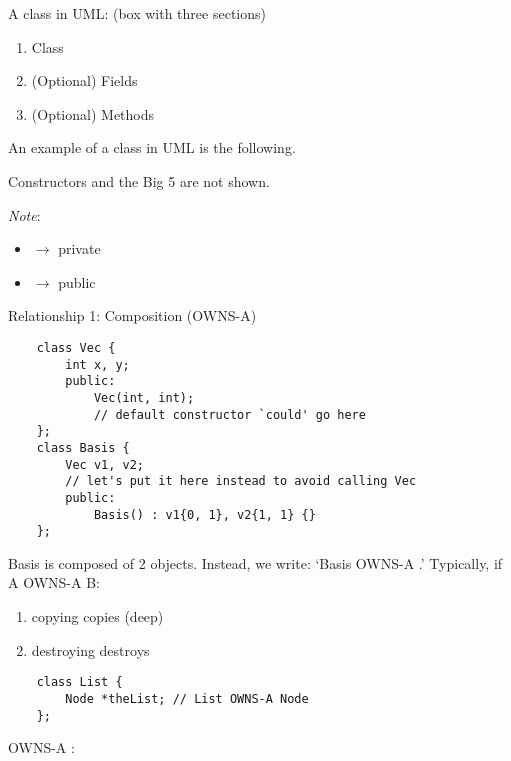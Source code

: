 A class in UML\@: (box with three sections)
\begin{enumerate}[label=(\arabic*)]
    \item Class
    \item (Optional) Fields
    \item (Optional) Methods
\end{enumerate}
An example of a class in UML is the following.
\begin{figure}[H]
    \centering
\end{figure}
Constructors and the Big 5 are not shown.

\emph{Note}:
\begin{itemize}
    \item \code{-} $ \rightarrow $ private
    \item \code{+} $ \rightarrow $ public
\end{itemize}

Relationship 1: Composition (OWNS-A)
\begin{lstlisting}
    class Vec {
        int x, y;
        public:
            Vec(int, int);
            // default constructor `could' go here
    };
    class Basis {
        Vec v1, v2;
        // let's put it here instead to avoid calling Vec
        public:
            Basis() : v1{0, 1}, v2{1, 1} {}
    };
\end{lstlisting}

Basis is composed of 2  objects. Instead, we write:
`Basis OWNS-A .' Typically, if A OWNS-A B\@:
\begin{enumerate}[label=(\arabic*)]
    \item copying  copies  (deep)
    \item destroying  destroys 
\end{enumerate}

\begin{lstlisting}
    class List {
        Node *theList; // List OWNS-A Node
    };
\end{lstlisting}

 OWNS-A :

\begin{figure}[H]
    \centering
\end{figure}

